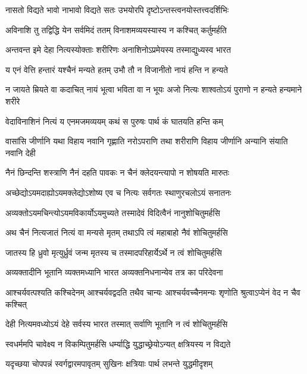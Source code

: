 \twolineshloka
{नासतो विद्यते भावो नाभावो विद्यते सतः}
{उभयोरपि दृष्टोऽन्तस्त्वनयोस्तत्त्वदर्शिभिः}%

\twolineshloka
{अविनाशि तु तद्विद्धि येन सर्वमिदं ततम्}
{विनाशमव्ययस्यास्य न कश्चित् कर्तुमर्हति}%

\twolineshloka
{अन्तवन्त इमे देहा नित्यस्योक्ताः शरीरिणः}
{अनाशिनोऽप्रमेयस्य तस्माद्युध्यस्व भारत}%

\twolineshloka
{य एनं वेत्ति हन्तारं यश्चैनं मन्यते हतम्}
{उभौ तौ न विजानीतो नायं हन्ति न हन्यते}%

\fourlineindentedshloka
{न जायते म्रियते वा कदाचित्}
{नायं भूत्वा भविता वा न भूयः}
{अजो नित्यः शाश्वतोऽयं पुराणो}
{न हन्यते हन्यमाने शरीरे}%

\twolineshloka
{वेदाविनाशिनं नित्यं य एनमजमव्ययम्}
{कथं स पुरुषः पार्थ कं घातयति हन्ति कम्}%

\fourlineindentedshloka
{वासांसि जीर्णानि यथा विहाय}
{नवानि गृह्णाति नरोऽपराणि}
{तथा शरीराणि विहाय जीर्णानि}
{अन्यानि संयाति नवानि देही}%

\twolineshloka
{नैनं छिन्दन्ति शस्त्राणि नैनं दहति पावकः}
{न चैनं क्लेदयन्त्यापो न शोषयति मारुतः}%

\twolineshloka
{अच्छेद्योऽयमदाह्योऽयमक्लेद्योऽशोष्य एव च}
{नित्यः सर्वगतः स्थाणुरचलोऽयं सनातनः}%

\twolineshloka
{अव्यक्तोऽयमचिन्त्योऽयमविकार्योऽयमुच्यते}
{तस्मादेवं विदित्वैनं नानुशोचितुमर्हसि}%

\twolineshloka
{अथ चैनं नित्यजातं नित्यं वा मन्यसे मृतम्}
{तथाऽपि त्वं महाबाहो नैवं शोचितुमर्हसि}%

\twolineshloka
{जातस्य हि ध्रुवो मृत्युर्ध्रुवं जन्म मृतस्य च}
{तस्मादपरिहार्येऽर्थे न त्वं शोचितुमर्हसि}%

\twolineshloka
{अव्यक्तादीनि भूतानि व्यक्तमध्यानि भारत}
{अव्यक्तनिधनान्येव तत्र का परिदेवना}%

\fourlineindentedshloka
{आश्चर्यवत्पश्यति कश्चिदेनम्}
{आश्चर्यवद्वदति तथैव चान्यः}
{आश्चर्यवच्चैनमन्यः शृणोति}
{श्रुत्वाऽप्येनं वेद न चैव कश्चित्}%

\twolineshloka
{देही नित्यमवध्योऽयं देहे सर्वस्य भारत}
{तस्मात् सर्वाणि भूतानि न त्वं शोचितुमर्हसि}%

\twolineshloka
{स्वधर्ममपि चावेक्ष्य न विकम्पितुमर्हसि}
{धर्म्याद्धि युद्धाच्छ्रेयोऽन्यत् क्षत्रियस्य न विद्यते}%

\twolineshloka
{यदृच्छया चोपपन्नं स्वर्गद्वारमपावृतम्}
{सुखिनः क्षत्रियाः पार्थ लभन्ते युद्धमीदृशम्}%

